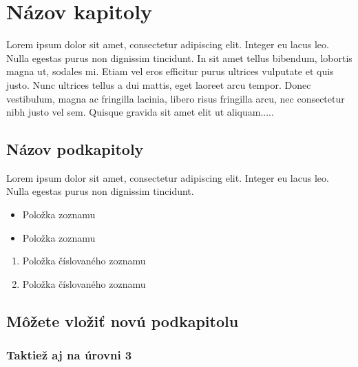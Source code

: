 \section{Názov kapitoly}
Lorem ipsum dolor sit amet, consectetur adipiscing elit. Integer eu lacus leo. Nulla egestas purus non dignissim tincidunt. In sit amet tellus bibendum, lobortis magna ut, sodales mi. Etiam vel eros efficitur purus ultrices vulputate et quis justo. Nunc ultrices tellus a dui mattis, eget laoreet arcu tempor. Donec vestibulum, magna ac fringilla lacinia, libero risus fringilla arcu, nec consectetur nibh justo vel sem. Quisque gravida sit amet elit ut aliquam.....

\subsection{Názov podkapitoly}
Lorem ipsum dolor sit amet, consectetur adipiscing elit. Integer eu lacus leo. Nulla egestas purus non dignissim tincidunt. 
\begin{itemize}
    \item Položka zoznamu
    \item Položka zoznamu
\end{itemize}
\hfill
\begin{enumerate}
    \item Položka číslovaného zoznamu
    \item Položka číslovaného zoznamu
\end{enumerate}
\subsection{Môžete vložiť novú podkapitolu}
\subsubsection{Taktiež aj na úrovni 3}
